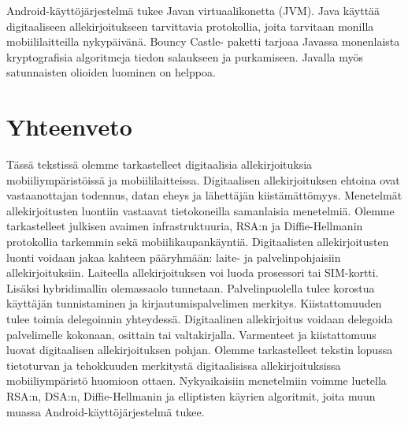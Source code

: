 \documentclass[finnish]{tktltiki2}
\theoremstyle{definition}
\theoremstyle{remark}
\begin{document}
Android-käyttöjärjestelmä tukee Javan virtuaalikonetta (JVM). Java käyttää digitaaliseen allekirjoitukseen tarvittavia protokollia, joita tarvitaan monilla mobiililaitteilla nykypäivänä. Bouncy Castle- paketti tarjoaa Javassa monenlaista kryptografisia algoritmeja tiedon salaukseen ja purkamiseen. Javalla myös satunnaisten olioiden luominen on helppoa. \cite{enti}   

\section{Yhteenveto}  

Tässä tekstissä olemme tarkastelleet digitaalisia allekirjoituksia mobiiliympäristöissä ja mobiililaitteissa. Digitaalisen allekirjoituksen ehtoina ovat vastaanottajan todennus, datan eheys ja lähettäjän kiistämättömyys. Menetelmät allekirjoitusten luontiin vastaavat tietokoneilla samanlaisia menetelmiä. Olemme tarkastelleet julkisen avaimen infrastruktuuria, RSA:n ja Diffie-Hellmanin protokollia tarkemmin sekä mobiilikaupankäyntiä. Digitaalisten allekirjoitusten luonti voidaan jakaa kahteen pääryhmään: laite- ja palvelinpohjaisiin allekirjoituksiin. Laiteella allekirjoituksen voi luoda prosessori tai SIM-kortti. Lisäksi hybridimallin olemassaolo tunnetaan. Palvelinpuolella tulee korostua käyttäjän tunnistaminen ja kirjautumispalvelimen merkitys. Kiistattomuuden tulee toimia delegoinnin yhteydessä. Digitaalinen allekirjoitus voidaan delegoida palvelimelle kokonaan, osittain tai valtakirjalla. Varmenteet ja kiistattomuus luovat digitaalisen allekirjoituksen pohjan. Olemme tarkastelleet tekstin lopussa tietoturvan ja tehokkuuden merkitystä digitaalisissa allekirjoituksissa mobiiliympäristö huomioon ottaen. Nykyaikaisiin menetelmiin voimme luetella RSA:n, DSA:n, Diffie-Hellmanin ja elliptisten käyrien algoritmit, joita muun muassa Android-käyttöjärjestelmä tukee.


%
%
%

\newpage






 
\end{document}
